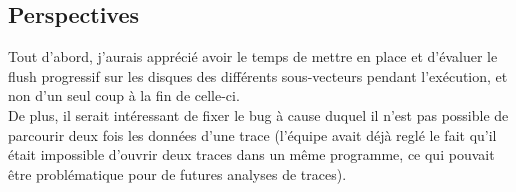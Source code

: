 
\subsection{Perspectives}\label{ssec:conclusion_perspectives}


Tout d'abord, j'aurais apprécié avoir le temps de mettre en place et d'évaluer le flush progressif sur les disques des différents sous-vecteurs pendant l'exécution, et non d'un seul coup à la fin de celle-ci.\\
De plus, il serait intéressant de fixer le bug à cause duquel il n'est pas possible de parcourir deux fois les données d'une trace (l'équipe avait déjà reglé le fait qu'il était impossible 
d'ouvrir deux traces dans un même programme, ce qui pouvait être problématique pour de futures analyses de traces).

